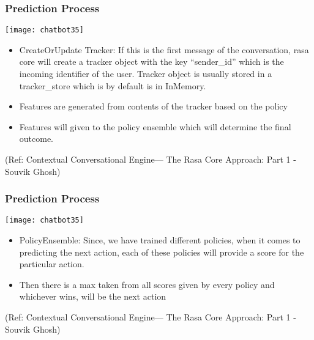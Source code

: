  \begin{frame}[fragile]\frametitle{Prediction Process}
 

\begin{center}
\texttt{[image: chatbot35]}

\end{center}

\begin{itemize}
\item CreateOrUpdate Tracker: If this is the first message of the conversation, rasa core will create a tracker object with the key ``sender\_id'' which is the incoming identifier of the user. Tracker object is usually stored in a tracker\_store which is by default is in InMemory.
\item Features are generated from contents of the tracker based on the policy 
\item Features will given to the policy ensemble which will determine the final outcome.
\end{itemize}


\tiny{(Ref: Contextual Conversational Engine— The Rasa Core Approach: Part 1 - Souvik Ghosh)}

\end{frame}

 \begin{frame}[fragile]\frametitle{Prediction Process}
 

\begin{center}
\texttt{[image: chatbot35]}

\end{center}

\begin{itemize}
\item PolicyEnsemble: Since, we have trained different policies, when it comes to predicting the next action, each of these policies will provide a score for the particular action. 
\item Then there is a max taken from all scores given by every policy and whichever wins, will be the next action
\end{itemize}


\tiny{(Ref: Contextual Conversational Engine— The Rasa Core Approach: Part 1 - Souvik Ghosh)}

\end{frame}

